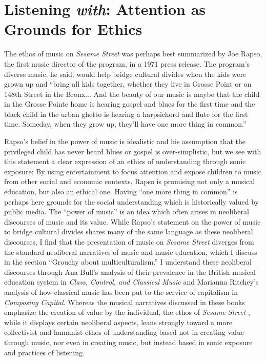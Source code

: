 \documentclass[12pt,letterpaper]{article}
\newcommand{\ses}{\textit{Sesame Street }}
\begin{document}
	\section*{Listening \textit{with}: Attention as Grounds for Ethics}	

	The ethos of music on \textit{Sesame Street} was perhaps best 
	summarized by Joe Rapso, the first music director of the program, in a
	1971 press release. The program's diverse music, he said, would
	help bridge cultural divides when the kids were grown up and ``bring all
	kids together, whether they live in Grosse Point or on 148th Street in 
	the Bronx... And the beauty of our music is maybe that the child in the
	Grosse Pointe home is hearing gospel and blues for the first time and 
	the black child in the urban ghetto is hearing a harpsichord and flute 
	for the first time. Someday, when they grow up, they'll have one more 
	thing in common.''\autocite[297]{Ostrofsky2012}

	Rapso's belief in the power of music is idealistic and his assumption
	that the privileged child has never heard blues or gospel is 
	over-simplistic, but we see with this statement a clear expression of
	an ethics of understanding through sonic exposure: 
	By using entertainment to focus attention and expose children to music 
	from other social and economic contexts,
	Rapso is promising not only a musical education, but also an ethical 
	one. Having ``one more thing in common'' is perhaps here grounds for 
	the social understanding which is historically valued by public media.  
	The ``power of music'' is an idea which often arises in neoliberal 
	discourses of music and its value. While Rapso's statement on the power
	of music to bridge cultural divides shares many of the same language
	as these neoliberal  discourses, I find that the presentation of music
	on \textit{Sesame Street} diverges from the standard neoliberal
	narratives of music and music education, which I discuss in the section
	``Grouchy about multiculturalism.'' I understand these neoliberal
	discourses through
	Ana Bull's analysis of their prevalence in the British musical
	education system in \textit{Class, Control, and Classical Music} and
	Marianna Ritchey's analysis of how classical music has been put to the
	service of capitalism in \textit{Composing Capital}. Whereas the musical
	narratives discussed in these books emphasize the creation of 
	value by the individual, the ethos of \ses, while it displays certain
	neoliberal aspects, leans strongly toward a more collectivist and 
	humanist ethos of understanding based not in creating value through
	music, nor even in creating music, but instead 
	based in sonic exposure and practices of listening.  
\end{document}
